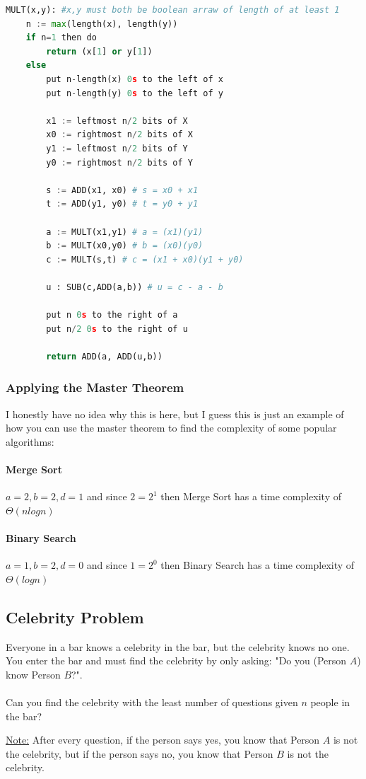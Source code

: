 \documentclass[12pt]{article}
\begin{document}
\begin{lstlisting}[language=Python]
MULT(x,y): #x,y must both be boolean arraw of length of at least 1
	n := max(length(x), length(y))
	if n=1 then do
		return (x[1] or y[1])
	else
		put n-length(x) 0s to the left of x
		put n-length(y) 0s to the left of y
		
		x1 := leftmost n/2 bits of X
		x0 := rightmost n/2 bits of X
		y1 := leftmost n/2 bits of Y
		y0 := rightmost n/2 bits of Y
		
		s := ADD(x1, x0) # s = x0 + x1
		t := ADD(y1, y0) # t = y0 + y1
		
		a := MULT(x1,y1) # a = (x1)(y1)
		b := MULT(x0,y0) # b = (x0)(y0)
		c := MULT(s,t) # c = (x1 + x0)(y1 + y0)
		
		u : SUB(c,ADD(a,b)) # u = c - a - b
		
		put n 0s to the right of a
		put n/2 0s to the right of u
		
		return ADD(a, ADD(u,b))
\end{lstlisting}

\subsubsection{Applying the Master Theorem}

I honestly have no idea why this is here, but I guess this is just an example of how you can use the master theorem to find the complexity of some popular algorithms:

\paragraph{Merge Sort} $a=2, b=2, d=1$ and since $2 = 2^1$ then Merge Sort has a time complexity of $\Theta (nlogn)$

\paragraph{Binary Search} $a=1, b=2,d=0$ and since $1 = 2^0$ then Binary Search has a time complexity of $\Theta (logn)$

\subsection{Celebrity Problem}

Everyone in a bar knows a celebrity in the bar, but the celebrity knows no one. You enter the bar and must find the celebrity by only asking: "Do you (Person $A$) know Person $B$?".\\
\\
Can you find the celebrity with the least number of questions given $n$ people in the bar?

\begin{tcolorbox}
	\underline{Note:} After every question, if the person says yes, you know that Person $A$ is not the celebrity, but if the person says no, you know that Person $B$ is not the celebrity.
\end{tcolorbox}

\newpage
\end{document}
